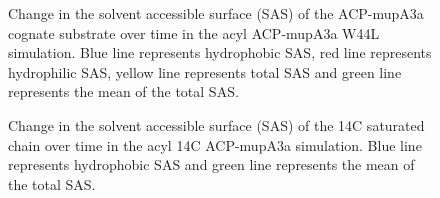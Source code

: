 \begin{singlespacing}
		\setlength\fboxsep{5pt}
		\setlength\fboxrule{1.5pt}
		\begin{figure}[htbp]
		\centering
		\caption[Change in the solvent accessible surface (SAS) of the ACP-mupA3a cognate substrate over time in the acyl ACP-mupA3a W44L simulation.]{Change in the solvent accessible surface (SAS) of the ACP-mupA3a cognate substrate over time in the acyl ACP-mupA3a W44L simulation. Blue line represents hydrophobic SAS, red line represents hydrophilic SAS, yellow line represents total SAS and green line represents the mean of the total SAS.}
		\label{fig:sasACPSPMMutant_area}
		\end{figure}

		\setlength\fboxsep{5pt}
		\setlength\fboxrule{1.5pt}
		\begin{figure}[htbp]
		\centering
		\caption[Change in the solvent accessible surface (SAS) of the 14C saturated chain over time in the acyl 14C ACP-mupA3a simulation.]{Change in the solvent accessible surface (SAS) of the 14C saturated chain over time in the acyl 14C ACP-mupA3a simulation. Blue line represents hydrophobic SAS and green line represents the mean of the total SAS.}
		\label{fig:sasACPSPD_area}
		\end{figure}


\end{singlespacing}
